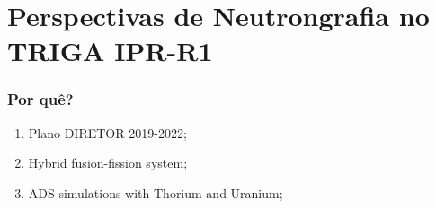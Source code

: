 \documentclass[svgnames,smaller,table]{beamer}
\begin{document}
\begin{frame}
  
\end{frame}
\begin{frame}
  
\end{frame}
\begin{frame}
  
\end{frame}
\begin{frame}
  
\end{frame}
\begin{frame}
  
\end{frame}




\section{Perspectivas de Neutrongrafia no TRIGA IPR-R1}
\begin{frame}
  \frametitle{Por quê?}
  \begin{enumerate}
  \item Plano DIRETOR 2019-2022\cite{PD2019};%
  \item Hybrid fusion-fission system\cite{Antonella2003};
  \item ADS simulations with Thorium and Uranium\cite{Wilson2017};
    \end{enumerate}
\end{frame}
\end{document}

